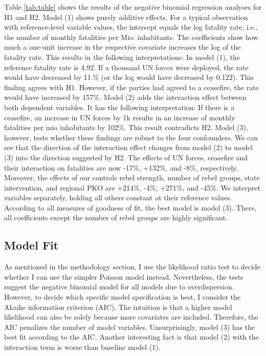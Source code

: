 \documentclass[12pt,english,a4paper,oneside]{article}
\begin{document}
Table \ref{tab:table} shows the results of the negative binomial regression analyses for H1 and H2. Model (1) shows purely additive effects. For a typical observation with reference-level variable values, the intercept equals the log fatality rate, i.e., the number of monthly fatalities per Mio. inhabitants. The coefficients show how much a one-unit increase in the respective covariate increases the log of the fatality rate. This results in the following interpretations: In model (1), the reference fatality rate is 4.92. If a thousand UN forces were deployed, the rate would have decreased by 11.\% (or the log would have decreased by 0.122). This finding agrees with H1. However, if the parties had agreed to a ceasefire, the rate would have increased by 157\%. Model (2) adds the interaction effect between both dependent variables. It has the following interpretation: If there is a ceasefire, an increase in UN forces by 1k results in an increase of monthly fatalities per mio inhabitants by 102\%. This result contradicts H2. Model (3), however, tests whether these findings are robust to the four confounders. We can see that the direction of the interaction effect changes from model (2) to model (3) into the direction suggested by H2. The effects of UN forces, ceasefire and their interaction on fatalities are now -17\%, +132\%, and -8\%, respectively. Moreover, the effects of our controls rebel strength, number of rebel groups, state intervention, and regional PKO are +214\%, -4\%, +271\%, and -45\%. We interpret variables separately, holding all others constant at their reference values. According to all measures of goodness of fit, the best model is model (3). There, all coefficients except the number of rebel groups are highly significant.

\hypertarget{model-fit}{%
\subsection{Model Fit}\label{model-fit}}

As mentioned in the methodology section, I use the likelihood ratio test to decide whether I can use the simpler Poisson model instead. Nevertheless, the tests suggest the negative binomial model for all models due to overdispersion. However, to decide which specific model specification is best, I consider the Akaike information criterion (AIC). The intuition is that a higher model likelihood can also be solely because more covariates are included. Therefore, the AIC penalizes the number of model variables. Unsurprisingly, model (3) has the best fit according to the AIC. Another interesting fact is that model (2) with the interaction term is worse than baseline model (1).
\end{document}
